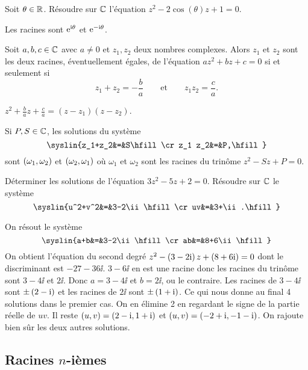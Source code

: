 \documentclass{magnolia}
\begin{document}
\begin{exoUnique}
\exo Soit $\theta\in\mathbb{R}$. Résoudre sur $\mathbb{C}$ l'équation
  $z^2-2\cos(\theta)z+1=0$.
  \begin{sol}
  Les racines sont ${\rm e}^{{\rm i}\theta}$ et ${\rm e}^{-{\rm i}\theta}$.
  \end{sol}
\end{exoUnique}

\begin{proposition}
Soit $a,b,c\in\mathbb{C}$ avec $a\not=0$ et $z_1,z_2$ deux nombres complexes. Alors $z_1$
et $z_2$ sont les deux racines, éventuellement égales, de l'équation
$az^2+bz+c=0$ si et seulement si
\[z_1+z_2=-\frac{b}{a} \qquad \text{et} \qquad z_1 z_2=\frac{c}{a}.\]
\end{proposition}

\begin{preuve}
$\displaystyle z^2+\frac{b}{a}z+\frac{c}{a}=(z-z_1)(z-z_2)$.
\end{preuve}
\begin{remarqueUnique}
\remarque Si $P,S\in\mathbb{C}$, les solutions du système
  \[\syslin{z_1+z_2&=&S\hfill\cr
             z_1 z_2&=&P,\hfill}\]
  sont $\left(\omega_1,\omega_2\right)$ et $\left(\omega_2,\omega_1\right)$ où $\omega_1$
  et $\omega_2$ sont les racines du trinôme $z^2-Sz+P=0$.
\end{remarqueUnique}
\begin{exos}
\exo Déterminer les solutions de l'équation $3z^2-5z+2=0$.
\exo Résoudre sur $\mathbb{C}$ le système
  \[\syslin{u^2+v^2&=&3-2\ii\hfill\cr
                 uv&=&3+\ii.\hfill}\]
  \begin{sol}
  On résout le système                 
  \[\syslin{a+b&=&3-2\ii\hfill\cr
             ab&=&8+6\ii\hfill}\]
  On obtient l'équation du second degré $z^2-\left(3-2{\rm i}\right)z+\left(8+6{\rm i}\right)=0$ dont le
  discriminant est $-27-36\ii$. $3-6\ii$ en est une racine donc les racines
  du trinôme sont $3-4\ii$ et $2\ii$. Donc $a=3-4\ii$ et $b=2\ii$, ou le contraire.
  Les racines de $3-4\ii$ sont $\pm\left(2-{\rm i}\right)$ et les racines de $2\ii$ sont
  $\pm\left(1+{\rm i}\right)$. Ce qui nous donne au final 4 solutions dans le premier cas.
  On en élimine 2 en regardant le signe de la partie réelle de $uv$. Il
  reste $\left(u,v\right)=\left(2-{\rm i},1+{\rm i}\right)$ et $\left(u,v\right)=\left(-2+{\rm i},-1-{\rm i}\right)$. On rajoute bien sûr
  les deux autres solutions.
  \end{sol}
\end{exos}

\subsection{Racines $n$-ièmes}
\end{document}
